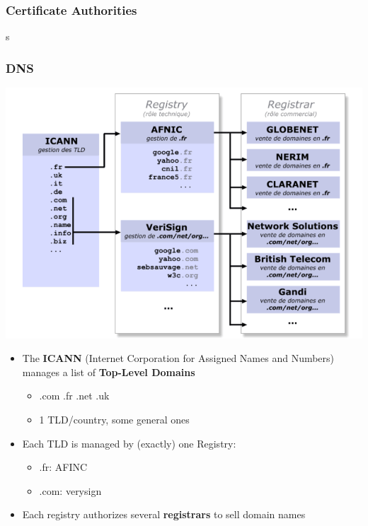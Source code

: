 \documentclass[
hyperref={pdfpagelabels=false}
,xcolor=table
]
{beamer}
\begin{document}
\begin{frame}
  \frametitle{Certificate Authorities}
  \begin{center}
    s
  \end{center}
\end{frame}



\begin{frame}
  \frametitle{DNS}

  \begin{center}
    \includegraphics[width=\textwidth,page=5]{fig/dns.png}
  \end{center}
 
  \begin{itemize}
  \item The \textbf{ICANN} (Internet Corporation for Assigned Names and Numbers) manages a list of \textbf{Top-Level Domains}
    \begin{itemize}
    \item .com .fr .net .uk
    \item 1 TLD/country, some general ones
    \end{itemize}
  \item Each TLD is managed by (exactly) one Registry:
    \begin{itemize}
    \item .fr: AFINC
    \item .com: verysign
    \end{itemize}
  \item Each registry authorizes several \textbf{registrars} to sell domain names
  \end{itemize}
\end{frame}
\end{document}
